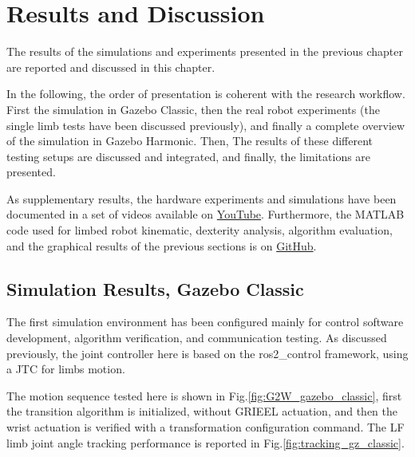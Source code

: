 \chapter{Results and Discussion}
\label{ch:chapter_eigth}%

The results of the simulations and experiments presented in the previous chapter are reported and discussed in this chapter. 

 In the following, the order of presentation is coherent with the research workflow. First the simulation in Gazebo Classic, then the real robot experiments (the single limb tests have been discussed previously), and finally a complete overview of the simulation in Gazebo Harmonic. Then, The results of these different testing setups are discussed and integrated, and finally, the limitations are presented. 

\vspace{1.0cm}

\begin{tcolorbox}[
  colback=bluepoli!20,
  colframe=bluepoli!40, 
  title=Additional Results and Resources,
  sharp corners=south,
  fonttitle=\bfseries,
  coltitle=bluepoli!90!black,
]
As supplementary results, the hardware experiments and simulations have been documented in a set of videos available on \href{https://youtube.com/playlist?list=PLFgoOtxCJKTPv_dibdvSUT_YPGDJBc_5C&si=bgCxZ_qWpax2N8Xt}{YouTube}.
Furthermore, the MATLAB code used for limbed robot kinematic, dexterity analysis, algorithm evaluation, and the graphical results of the previous sections is on \href{https://github.com/AlePuglisi/limbed-robot-control}{GitHub}.
\end{tcolorbox}
 
\newpage
\section{Simulation Results, Gazebo Classic}
\label{sec:sim_result}

The first simulation environment has been configured mainly for control software development, algorithm verification, and communication testing. As discussed previously, the joint controller here is based on the ros2\_control framework, using a JTC for limbs motion. 

The motion sequence tested here is shown in Fig.\ref{fig:G2W_gazebo_classic}, first the transition algorithm is initialized, without GRIEEL actuation, and then the wrist actuation is verified with a transformation configuration command.  
The LF limb joint angle tracking performance is reported in Fig.\ref{fig:tracking_gz_classic}. 

